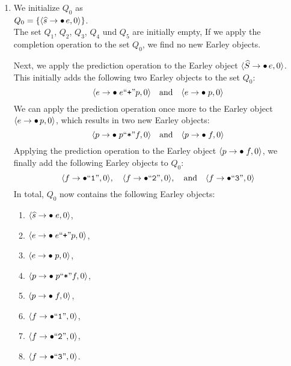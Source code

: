 \begin{enumerate}
\item We initialize $Q_0$ as
      \\[0.2cm]
      \hspace*{1.3cm}
      $Q_0 = \{ \pair(\widehat{s} \rightarrow \bullet\, e, 0) \}$. 
      \\[0.2cm]
      The set $Q_1$, $Q_2$, $Q_3$, $Q_4$ und $Q_5$ are initially empty,  If we apply the completion operation
      to the set $Q_0$, we find no new Earley objects.

      Next, we apply the prediction operation to the Earley object  
      $\pair(\widehat{S} \rightarrow \bullet\, e, 0)$. This initially adds the following two Earley objects to
      the set $Q_0$: 
      \[
        \pair(e \rightarrow \bullet\; e \squoted{+} p, 0) 
        \quad \text{and} \quad 
        \pair(e \rightarrow \bullet\; p, 0)
      \]  
      We can apply the prediction operation once more to the Earley object $\pair(e \rightarrow \bullet\, p, 0)$,
      which results in two new Earley objects:   
      \[
        \pair(p \rightarrow \bullet\; p \squoted{*} f, 0) 
        \quad \text{and} \quad 
        \pair(p \rightarrow \bullet\; f, 0)
      \]  
      Applying the prediction operation to the Earley object $\pair(p \rightarrow \bullet\; f, 0)$, we finally
      add the following Earley objects to $Q_0$:   
      \[
        \pair(f \rightarrow \bullet \squoted{1}, 0), \quad 
        \pair(f \rightarrow \bullet \squoted{2}, 0), \quad \text{and} \quad 
        \pair(f \rightarrow \bullet \squoted{3}, 0)
      \]  
      In total, $Q_0$ now contains the following Earley objects:  
      \begin{enumerate}
      \item $\pair(\widehat{s} \rightarrow \bullet\; e, 0)$,
      \item $\pair(e \rightarrow \bullet\; e \squoted{+} p, 0)$,
      \item $\pair(e \rightarrow \bullet\; p, 0)$,
      \item $\pair(p \rightarrow \bullet\; p \squoted{*} f, 0)$,
      \item $\pair(p \rightarrow \bullet\; f, 0)$,
      \item $\pair(f \rightarrow \bullet \squoted{1}, 0)$,
      \item $\pair(f \rightarrow \bullet \squoted{2}, 0)$,
      \item $\pair(f \rightarrow \bullet \squoted{3}, 0)$.
      \end{enumerate}

\end{enumerate}
